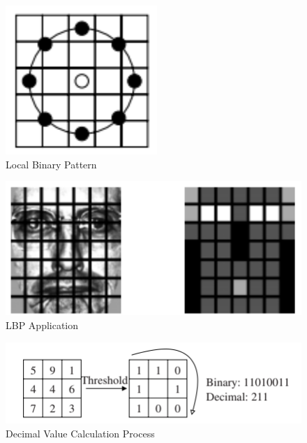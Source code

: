\documentclass[
]{article}
\begin{document}
\begin{figure}[htbp]
  \centering
  \includegraphics[width=0.4\linewidth]{images/lbph.png}
  \caption{Local Binary Pattern}
\end{figure}

\begin{figure}[htbp]
  \centering
  \includegraphics[width=0.4\linewidth]{images/lbph_1.png}
  \caption{LBP Application}
\end{figure}

\begin{figure}[htbp]
  \centering
  \includegraphics[width=0.4\linewidth]{images/lbph_2.png}
  \caption{Decimal Value Calculation Process}
\end{figure}
\end{document}
